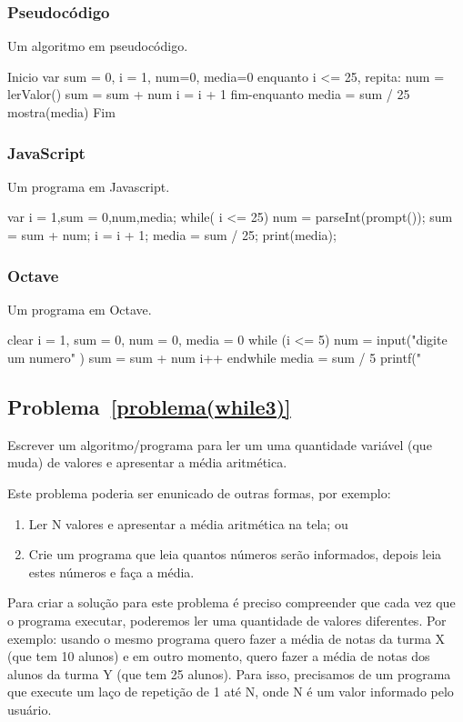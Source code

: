 \subsubsection*{Pseudocódigo}
Um algoritmo em pseudocódigo.
\begin{pseudocode}
Inicio
var sum = 0, i = 1, num=0, media=0
enquanto i <= 25, repita:
	num = lerValor()
	sum = sum + num
	i = i + 1
fim-enquanto
media = sum / 25
mostra(media)
Fim
\end{pseudocode}

\subsubsection*{JavaScript}
Um programa em Javascript.
\begin{code}
var i = 1,sum = 0,num,media;
while( i <= 25){
  num = parseInt(prompt());
  sum = sum + num;
  i = i + 1;
}
media = sum / 25;
print(media);
\end{code}

\subsubsection*{Octave}
Um programa em Octave.
\begin{code}
clear
i = 1, sum = 0, num = 0, media = 0
while (i <= 5)
  num = input("digite um numero" )
  sum = sum + num
  i++
endwhile
media = sum / 5
printf(" %
\end{code}


\subsection*{Problema~\ref{problema(while3)}}
\label{problema(while3)}
Escrever um algoritmo/programa para ler um uma quantidade variável (que muda) de valores e apresentar a média aritmética. 

Este problema poderia ser enunicado de outras formas, por exemplo:
\begin{enumerate}
  \item Ler N valores e apresentar a média aritmética na tela; ou
  \item Crie um programa que leia quantos números serão informados, depois leia estes números e faça a média.
\end{enumerate}

Para criar a solução para este problema é preciso compreender que cada vez que o programa executar, poderemos ler uma quantidade de valores diferentes. Por exemplo: usando o  mesmo programa quero fazer a média de notas da turma X (que tem 10 alunos) e em outro momento, quero fazer a média de notas dos alunos da turma Y (que tem 25 alunos). Para isso, precisamos de um programa que execute um laço de repetição de 1 até N, onde N é um valor informado pelo usuário.

